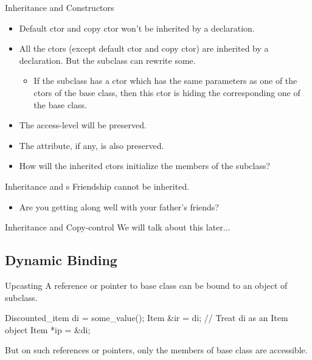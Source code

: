\documentclass{beamer}
\begin{document}
\begin{frame}{Inheritance and Constructors}
    \begin{itemize}
        \item Default ctor and copy ctor won't be inherited by a  declaration. 
        \item All the ctors (except default ctor and copy ctor) are inherited by a  declaration. But the subclass can rewrite some.
        \begin{itemize}
            \item If the subclass has a ctor which has the same parameters as one of the ctors of the base class, then this ctor is hiding the corresponding one of the base class.
        \end{itemize}
        \item The access-level will be preserved. 
        \item The  attribute, if any, is also preserved.
        \item How will the inherited ctors initialize the members of the subclass?
    \end{itemize}
\end{frame}

\begin{frame}{Inheritance and s}
    Friendship cannot be inherited.
    \begin{itemize}
        \item Are you getting along well with your father's friends?
    \end{itemize}
\end{frame}

\begin{frame}{Inheritance and Copy-control}
    We will talk about this later...
\end{frame}

\subsection{Dynamic Binding}

\begin{frame}[fragile]{Upcasting}
    A reference or pointer to base class can be bound to an object of subclass. 
    \begin{cpp}
Discounted_item di = some_value();
Item &ir = di;  // Treat di as an Item object
Item *ip = &di;
    \end{cpp}
    But on such references or pointers, only the members of base class are accessible. 
\end{frame}
\end{document}
